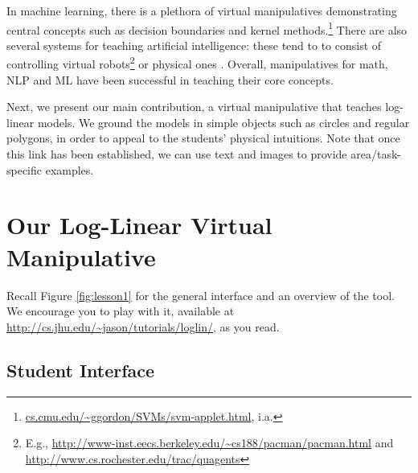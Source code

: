 \documentclass[11pt,letterpaper]{article}
\newcommand{\WhereToFind}[0]{\url{http://cs.jhu.edu/~jason/tutorials/loglin/}}
\begin{document}
In machine learning, there is a plethora of virtual manipulatives demonstrating central concepts such 
as decision boundaries and kernel methods.\footnote{\url{cs.cmu.edu/~ggordon/SVMs/svm-applet.html}, i.a.} 
There are also several systems for teaching artificial intelligence: these tend to to consist of controlling 
virtual robots\footnote{E.g., \url{http://www-inst.eecs.berkeley.edu/~cs188/pacman/pacman.html} and 
\url{http://www.cs.rochester.edu/trac/quagents}}
or physical ones \cite{tokic2012robot}.
Overall, manipulatives for math, NLP and ML have been successful in teaching their core concepts. 

Next, we present our main contribution, a virtual manipulative that teaches log-linear models. We ground 
the models in simple objects such as circles and regular polygons, in order to appeal to the 
students' physical intuitions. Note that once this link has been established, we can use text and images to 
provide area/task-specific examples.


\section{Our Log-Linear Virtual Manipulative}\label{sec:overview}

Recall Figure \ref{fig:lesson1} for the general interface and an overview 
of the tool. We encourage you to play with it, available at 
\WhereToFind{}, as you read.



\subsection{Student Interface}
\end{document}
